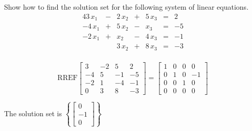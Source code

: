 
\begin{exerciseStatement}


Show how to find the solution set for the following system of linear equations. 
\begin{alignat*}{4} 3 \, x_{1} &-& 2 \, x_{2} &+& 5 \, x_{3} &=& 2 \\-4 \, x_{1} &+& 5 \, x_{2} &-& x_{3} &=& -5 \\-2 \, x_{1} &+& x_{2} &-& 4 \, x_{3} &=& -1 \\ & & 3 \, x_{2} &+& 8 \, x_{3} &=& -3 \\ \end{alignat*}
            


\end{exerciseStatement}
    
\begin{exerciseAnswer} 
\[\mathrm{RREF} \left[\begin{array}{ccc|c}
3 & -2 & 5 & 2 \\
-4 & 5 & -1 & -5 \\
-2 & 1 & -4 & -1 \\
0 & 3 & 8 & -3
\end{array}\right]  =  \left[\begin{array}{ccc|c}
1 & 0 & 0 & 0 \\
0 & 1 & 0 & -1 \\
0 & 0 & 1 & 0 \\
0 & 0 & 0 & 0
\end{array}\right] \]

The solution set is \( \left\{ \left[\begin{array}{c}
0 \\
-1 \\
0
\end{array}\right] \right\} \)


\end{exerciseAnswer}
    
